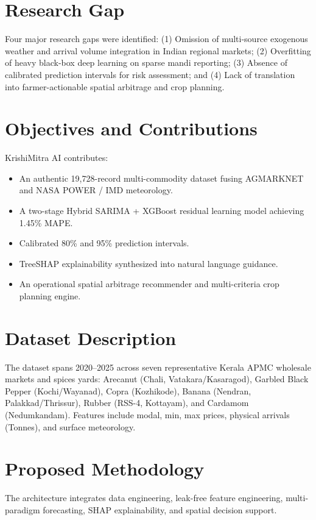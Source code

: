 \documentclass[journal,10pt,twocolumn]{IEEEtran}
\begin{document}
\section{Research Gap}
Four major research gaps were identified: (1) Omission of multi-source exogenous weather and arrival volume integration in Indian regional markets; (2) Overfitting of heavy black-box deep learning on sparse mandi reporting; (3) Absence of calibrated prediction intervals for risk assessment; and (4) Lack of translation into farmer-actionable spatial arbitrage and crop planning.

\section{Objectives and Contributions}
KrishiMitra AI contributes:
\begin{itemize}
    \item An authentic 19,728-record multi-commodity dataset fusing AGMARKNET and NASA POWER / IMD meteorology.
    \item A two-stage Hybrid SARIMA + XGBoost residual learning model achieving 1.45\% MAPE.
    \item Calibrated 80\% and 95\% prediction intervals.
    \item TreeSHAP explainability synthesized into natural language guidance.
    \item An operational spatial arbitrage recommender and multi-criteria crop planning engine.
\end{itemize}

\section{Dataset Description}
The dataset spans 2020--2025 across seven representative Kerala APMC wholesale markets and spices yards: Arecanut (Chali, Vatakara/Kasaragod), Garbled Black Pepper (Kochi/Wayanad), Copra (Kozhikode), Banana (Nendran, Palakkad/Thrissur), Rubber (RSS-4, Kottayam), and Cardamom (Nedumkandam). Features include modal, min, max prices, physical arrivals (Tonnes), and surface meteorology.

\section{Proposed Methodology}
The architecture integrates data engineering, leak-free feature engineering, multi-paradigm forecasting, SHAP explainability, and spatial decision support.
\end{document}

